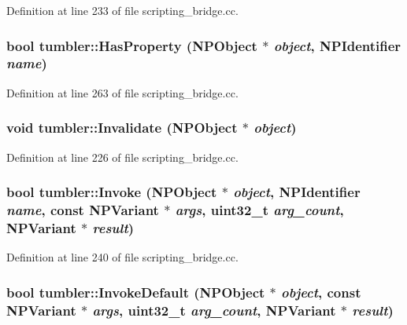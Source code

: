 Definition at line 233 of file scripting\_\-bridge.cc.

\hypertarget{namespacetumbler_a2f2417690297eb874bfa76c0d125a64e}{
\subsubsection[{HasProperty}]{\setlength{\rightskip}{0pt plus 5cm}bool tumbler::HasProperty ({\bf NPObject} $\ast$ {\em object}, \/  {\bf NPIdentifier} {\em name})}}
\label{namespacetumbler_a2f2417690297eb874bfa76c0d125a64e}


Definition at line 263 of file scripting\_\-bridge.cc.

\hypertarget{namespacetumbler_ab219f1f08239d2675431fd3e3299b71d}{
\subsubsection[{Invalidate}]{\setlength{\rightskip}{0pt plus 5cm}void tumbler::Invalidate ({\bf NPObject} $\ast$ {\em object})}}
\label{namespacetumbler_ab219f1f08239d2675431fd3e3299b71d}


Definition at line 226 of file scripting\_\-bridge.cc.

\hypertarget{namespacetumbler_a1336a275c5d007684384b01b032dec56}{
\subsubsection[{Invoke}]{\setlength{\rightskip}{0pt plus 5cm}bool tumbler::Invoke ({\bf NPObject} $\ast$ {\em object}, \/  {\bf NPIdentifier} {\em name}, \/  const {\bf NPVariant} $\ast$ {\em args}, \/  uint32\_\-t {\em arg\_\-count}, \/  {\bf NPVariant} $\ast$ {\em result})}}
\label{namespacetumbler_a1336a275c5d007684384b01b032dec56}


Definition at line 240 of file scripting\_\-bridge.cc.

\hypertarget{namespacetumbler_a35b1cc267fcf3e0beed6b9e45caa65ef}{
\subsubsection[{InvokeDefault}]{\setlength{\rightskip}{0pt plus 5cm}bool tumbler::InvokeDefault ({\bf NPObject} $\ast$ {\em object}, \/  const {\bf NPVariant} $\ast$ {\em args}, \/  uint32\_\-t {\em arg\_\-count}, \/  {\bf NPVariant} $\ast$ {\em result})}}
\label{namespacetumbler_a35b1cc267fcf3e0beed6b9e45caa65ef}


